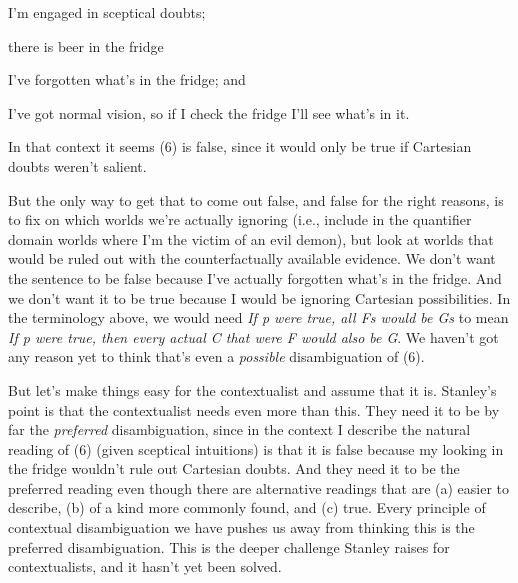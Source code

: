 \begin{itemize*}
\item I'm engaged in sceptical doubts;
\item there is beer in the fridge
\item I've forgotten what's in the fridge; and
\item I've got normal vision, so if I check the fridge I'll see what's in it.
\end{itemize*}

\noindent In that context it seems (6) is false, since it would only be true if Cartesian doubts weren't salient.


\noindent But the only way to get that to come out false, and false for the right reasons, is to fix on which worlds we're actually ignoring (i.e., include in the quantifier domain worlds where I'm the victim of an evil demon), but look at worlds that would be ruled out with the counterfactually available evidence. We don't want the sentence to be false because I've actually forgotten what's in the fridge. And we don't want it to be true because I would be ignoring Cartesian possibilities. In the terminology above, we would need \textit{If p were true, all Fs would be Gs} to mean \textit{If p were true, then every actual C that were F would also be G}. We haven't got any reason yet to think that's even a \textit{possible} disambiguation of (6). 

But let's make things easy for the contextualist and assume that it is. Stanley's point is that the contextualist needs even more than this. They need it to be by far the  \textit{preferred} disambiguation, since in the context I describe the natural reading of (6) (given sceptical intuitions) is that it is false because my looking in the fridge wouldn't rule out Cartesian doubts. And they need it to be the preferred reading even though there are alternative readings that are (a) easier to describe, (b) of a kind more commonly found, and (c) true. Every principle of contextual disambiguation we have pushes us away from thinking this is the preferred disambiguation. This is the deeper challenge Stanley raises for contextualists, and it hasn't yet been solved.

